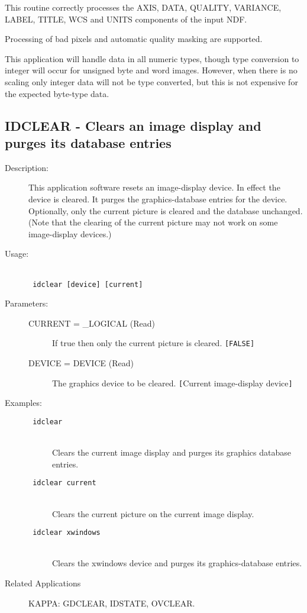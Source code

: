 \documentclass[twoside,11pt]{article}
\newcommand{\stardocinitials}  {SUN}
\newcommand{\stardocnumber}    {239.2}
\newcommand{\stardocname}{\stardocinitials /\stardocnumber}
\newcommand{\htmlref}[2]{#1}
\newcommand{\xlabel}[1]{}
\newlength{\sstbannerlength}
\newlength{\sstcaptionlength}
\newlength{\sstexampleslength}
\newlength{\sstexampleswidth}
\newcommand{\sstroutine}[3]{
   \goodbreak
   \markboth{{\stardocname}~ --- #1}{{\stardocname}~ --- #1}
   \rule{\textwidth}{0.5mm}
   \vspace{-7ex}
   \newline
   \settowidth{\sstbannerlength}{{\Large {\bf #1}}}
   \setlength{\sstcaptionlength}{\textwidth}
   \setlength{\sstexampleslength}{\textwidth}
   \addtolength{\sstbannerlength}{0.5em}
   \addtolength{\sstcaptionlength}{-2.0\sstbannerlength}
   \addtolength{\sstcaptionlength}{-4.9pt}
   \settowidth{\sstexampleswidth}{{\bf Examples:}}
   \addtolength{\sstexampleslength}{-\sstexampleswidth}
   \parbox[t]{\sstbannerlength}{\flushleft{\Large {\bf #1}}}
   \parbox[t]{\sstcaptionlength}{\center{\Large #2}}
   \parbox[t]{\sstbannerlength}{\flushright{\Large {\bf #1}}}
   \begin{description}
      #3
   \end{description}
}
\newcommand{\sstdescription}[1]{\item[Description:] #1}
\newcommand{\sstusage}[1]{\pagebreak[3] \item[Usage:] \mbox{} \\[1.3ex] {\ssttt #1}}
\newcommand{\sstparameters}[1]{
   \goodbreak 
   \item[Parameters:] \mbox{} \\
   \vspace{-3.5ex}
   \begin{description}
      #1
   \end{description}
}
\newcommand{\sstexamples}[1]{
   \goodbreak
   \item[Examples:] \mbox{} \\
   \vspace{-3.5ex}
   \begin{description}
      #1
   \end{description}
}
\newcommand{\sstsubsection}[1]{ \item[{#1}] \mbox{} \\}
\newcommand{\sstexamplesubsection}[2]{\sloppy \item{\ssttt #1} \mbox{} \\ #2 }
\newcommand{\sstdiytopic}[2]{\goodbreak \item[{\hspace{-0.35em}#1\hspace{-0.35em}:}] \mbox{} \\[1.3ex] #2}
\newcommand{\sstitem}{\item}
\newcommand{\ssttt}{\tt}
\renewcommand{\sstroutine}[3]{
      \subsection{#1\xlabel{#1}-\label{#1}#2}
      \begin{description}
         #3
      \end{description}
   }
\renewcommand{\sstdescription}[1]{\item[Description:]
      \begin{description}
         #1
      \end{description}
   }
\renewcommand{\sstusage}[1]{\htmlref{\item[Usage:]}{ap:usage} \mbox{} \\ {\ssttt #1}}
\renewcommand{\sstparameters}[1]{
      \htmlref{\item[Parameters:]}{se:param}
      \begin{description}
         #1
      \end{description}
   }
\renewcommand{\sstexamples}[1]{
      \htmlref{\item[Examples:]}{ap:example}
      \begin{description}
         #1
      \end{description}
   }
\renewcommand{\sstsubsection}[1]{\item[{#1}]}
\renewcommand{\sstexamplesubsection}[2]{\item[{\ssttt #1}] \\ #2}
\renewcommand{\sstdiytopic}[2]{\item[{#1}]
      \begin{description}
         #2
      \end{description}
   }
\begin{document}
{{{         \sstitem
         This routine correctly processes the AXIS, DATA, QUALITY,
         VARIANCE, LABEL, TITLE, WCS and UNITS components of the input NDF.

         \sstitem
         Processing of bad pixels and automatic quality masking are
         supported.

         \sstitem
         This application will handle data in all numeric types, though
         type conversion to integer will occur for unsigned byte and word
         images.  However, when there is no scaling only integer data will
         not be type converted, but this is not expensive for the expected
         byte-type data.
      }
   }
}
\sstroutine{
   IDCLEAR
}{
   Clears an image display and purges its database entries
}{
   \sstdescription{
      This application software resets an image-display device. In effect
      the device is cleared.  It purges the graphics-database entries
      for the device.  Optionally, only the current picture is cleared
      and the database unchanged.  (Note that the clearing of the current
      picture may not work on some image-display devices.)
   }
   \sstusage{
      idclear [device] [current]
   }
   \sstparameters{
      \sstsubsection{
         CURRENT = \_LOGICAL (Read)
      }{
         If true then only the current picture is cleared. {\tt [FALSE]}
      }
      \sstsubsection{
         DEVICE = DEVICE (Read)
      }{
         The graphics device to be cleared. {\tt [}Current image-display
         device{\tt ]}
      }
   }
   \sstexamples{
      \sstexamplesubsection{
         idclear
      }{
         Clears the current image display and purges its graphics
         database entries.
      }
      \sstexamplesubsection{
         idclear current
      }{
         Clears the current picture on the current image display.
      }
      \sstexamplesubsection{
         idclear xwindows
      }{
         Clears the xwindows device and purges its graphics-database entries.
      }
   }
   \sstdiytopic{
      Related Applications
   }{
      KAPPA: GDCLEAR, IDSTATE, OVCLEAR.
   }
}
\end{document}
